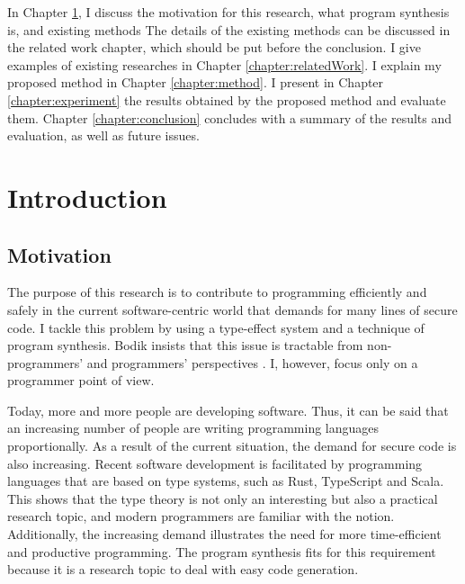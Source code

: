 \documentclass[12pt, a4paper, titlepage]{report}
\begin{document}
In Chapter \ref{chapter:introduction}, I discuss the motivation for this research, what program synthesis is, and existing methods  The details of the existing methods can be discussed in the related work chapter, which should be  put before the conclusion.
I give examples of existing researches in Chapter \ref{chapter:relatedWork}.
I explain my proposed method in Chapter \ref{chapter:method}.
I present in Chapter \ref{chapter:experiment} the results obtained by the proposed method and evaluate them.
Chapter \ref{chapter:conclusion} concludes with a summary of the results and evaluation, as well as future issues.

\chapter{Introduction}\label{chapter:introduction}
 
  \section{Motivation}
    The purpose of this research is to contribute to programming efficiently and safely in the current software-centric world that demands for many lines of secure code.
    I tackle this problem by using a type-effect system and a technique of program synthesis.
    Bodik insists that this issue is tractable from non-programmers' and programmers' perspectives \cite{bodik:2015}.
    I, however, focus only on a programmer point of view.

    Today, more and more people are developing software.
    Thus, it can be said that an increasing number of people are writing programming languages proportionally.
    As a result of the current situation, the demand for secure code is also increasing.
    Recent software development is facilitated by programming languages that are based on type systems, such as Rust, TypeScript and Scala.
    This shows that the type theory is not only an interesting but also a practical research topic, and modern programmers are familiar with the notion.
    Additionally, the increasing demand illustrates the need for more time-efficient and productive programming.
    The program synthesis fits for this requirement because it is a research topic to deal with easy code generation.
\end{document}
